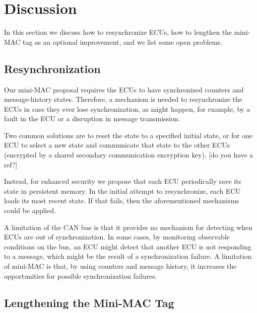 \section{Discussion}
\label{discuss}

In this section we discuss how to resynchronize ECUs, 
how to lengthen the mini-MAC tag as an optional improvement, 
and we list some open problems.


\subsection{Resynchronization}
\label{resynch}

Our mini-MAC proposal requires the ECUs to have synchronized counters and message-history states.
Therefore, a mechanism is needed to resynchronize the ECUs in case they ever lose synchronization,
as might happen, for example, by a fault in the ECU or a disruption in message transmission.

Two common solutions are to reset the state to a specified initial state, or for one ECU to select
a new state and communicate that state to the other ECUs (encrypted by a shared secondary communication
encryption key).  [do you have a ref?]

Instead, for enhanced security we propose that each ECU periodically save its state in persistent memory.  
In the initial attempt to resynchronize, each ECU loads its most recent state.  If that fails, then the aforementioned
mechanisms could be applied.

A limitation of the CAN bus is that it provides no mechanism for detecting when ECUs are out
of synchronization.  In some cases, by monitoring observable conditions on the bus, 
an ECU might detect that another ECU is not responding to a message, which might be
the result of a synchronization failure.  A limitation of mini-MAC is that, by using
counters and message history, it increases the opportunities for possible synchronization failures.


\subsection{Lengthening the Mini-MAC Tag}
\label{addingbits}

